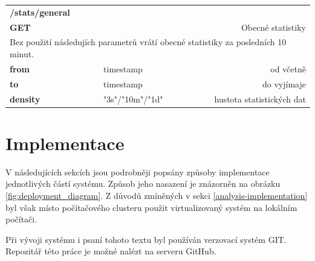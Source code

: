 \documentclass[thesis=B,czech]{FITthesis}[2012/06/26]
\begin{document}
\begin{table}[h]
\begin{tabular}{llllr}
\rowcolor[HTML]{EFEFEF}
\large \textbf{/stats/general}        &         &                 &        & \multicolumn{1}{l}{}                \\
\rowcolor[HTML]{EFEFEF}
\textbf{GET}          &         &                 &        & Obecné statistiky                        \\
\multicolumn{5}{l}{\parbox[t]{12.8cm}{Bez použití následujích parametrů vrátí obecné statistiky za posledních 10 minut.  }  } \\
\textbf{from}         &         & timestamp       &        & od včetně                           \\
\textbf{to}           &         & timestamp       &        & do vyjímaje                         \\
\textbf{density}        &         & "3s"/"10m"/"1d"         &        & hustota statistických dat   \\
\end{tabular}
\end{table}


\chapter{Implementace}
\label{implementace}
V následujících sekcích jsou podrobněji popsány způsoby implementace jednotlivých částí systému. Způsob jeho nasazení je znázorněn na obrázku \ref{fig:deployment_diagram}. Z důvodů zmíněných v sekci \ref{analysis-implementation} byl však místo počítačového clusteru použit virtualizovaný systém na lokálním počítači. 

Při vývoji systému i psaní tohoto textu byl používán verzovací systém GIT. Repozitář této práce je možné nalézt na serveru GitHub\cite{ghrtyrtt}. 
\end{document}

